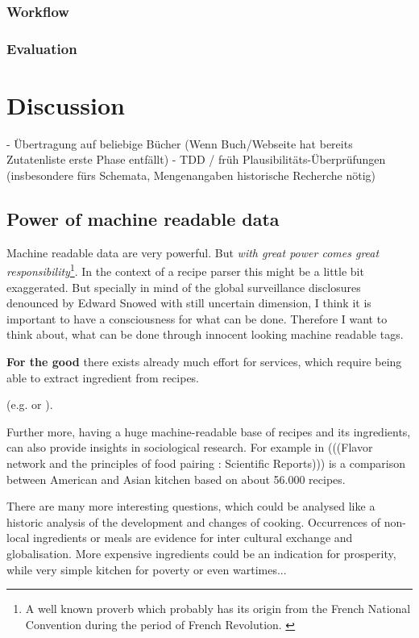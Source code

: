 \documentclass[12pt, twoside]{report}
\begin{document}
\subsection{Workflow}
\subsection{Evaluation}

\chapter{Discussion}
- Übertragung auf beliebige Bücher (Wenn Buch/Webseite hat bereits Zutatenliste erste Phase entfällt)
- TDD / früh Plausibilitäts-Überprüfungen (insbesondere fürs Schemata, Mengenangaben historische Recherche nötig)

\section{Power of machine readable data}
Machine readable data are very powerful. But \textit{with great power comes great responsibility}\footnote{A well known proverb which probably has its origin from the French National Convention during the period of French Revolution. \parencite{quoteInvestigator}}. In the context of a recipe parser this might be a little bit exaggerated. But specially in mind of the global surveillance disclosures denounced by Edward Snowed with still uncertain dimension, I think it is important to have a consciousness for what can be done. Therefore I want to think about, what can be done through innocent looking machine readable tags. 
\bigskip

\textbf{For the good} there exists already much effort for services, which require being able to extract ingredient from recipes.

 (e.g. \cite{ingredientNetworks} or \cite{recipeRecommendation}).

Further more, having a huge machine-readable base of recipes and its ingredients, can also provide insights in sociological research. For example in (((Flavor network and the principles of food pairing : Scientific Reports))) is a comparison between American and Asian kitchen based on about 56.000 recipes.

There are many more interesting questions, which could be analysed like a historic analysis of the development and changes of cooking. Occurrences of non-local ingredients or meals are evidence for inter cultural exchange and globalisation. More expensive ingredients could be an indication for prosperity, while very simple kitchen for poverty or even wartimes...
\bigskip
\end{document}
